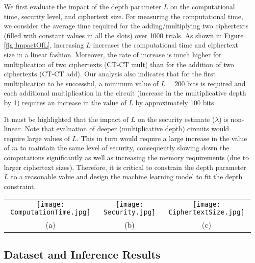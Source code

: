 \documentclass[letterpaper]{article} %
\begin{document}
We first evaluate the impact of the depth parameter $L$ on the computational time, security level, and ciphertext size. For measuring the computational time, we consider the average time required for the adding/multiplying two ciphertexts (filled with constant values in all the slots) over 1000 trials. As shown in Figure \ref{fig:ImpactOfL}, increasing $L$ increases the computational time and ciphertext size in a linear fashion. Moreover, the rate of increase is much higher for multiplication of two ciphertexts (CT-CT mult) than for the addition of two ciphertexts (CT-CT add). Our analysis also indicates that for the first multiplication to be successful, a minimum value of $L = 200$ bits is required and each additional multiplication in the circuit (increase in the multiplicative depth by 1) requires an increase in the value of $L$ by approximately 100 bits.

It must be highlighted that the impact of $L$ on the security estimate ($\lambda$) is non-linear. Note that evaluation of deeper (multiplicative depth) circuits would require large values of $L$. This in turn would require a large increase in the value of $m$ to maintain the same level of security, consequently slowing down the computations significantly as well as increasing the memory requirements (due to larger ciphertext sizes). Therefore, it is critical to constrain the depth parameter $L$ to a reasonable value and design the machine learning model to fit the depth constraint.

\begin{figure*}
\begin{center}
\begin{tabular}{ccc}
    \texttt{[image: ComputationTime.jpg]}
    & \texttt{[image: Security.jpg]}
    & \texttt{[image: CiphertextSize.jpg]}
\\ (a) & (b) & (c)\\
\end{tabular}
\end{center}
\caption{Impact of the depth parameter $L$ on (a) computational time, (b) security level, and (c) ciphertext size. For this experiment, the value of $m$ and $r$ are set to $2^{16}$ and $35$, respectively. The computational time is the average time required for adding/multiplying two ciphertexts over 1000 trials.}
\label{fig:ImpactOfL}
\end{figure*}

\subsection{Dataset and Inference Results}
\end{document}
